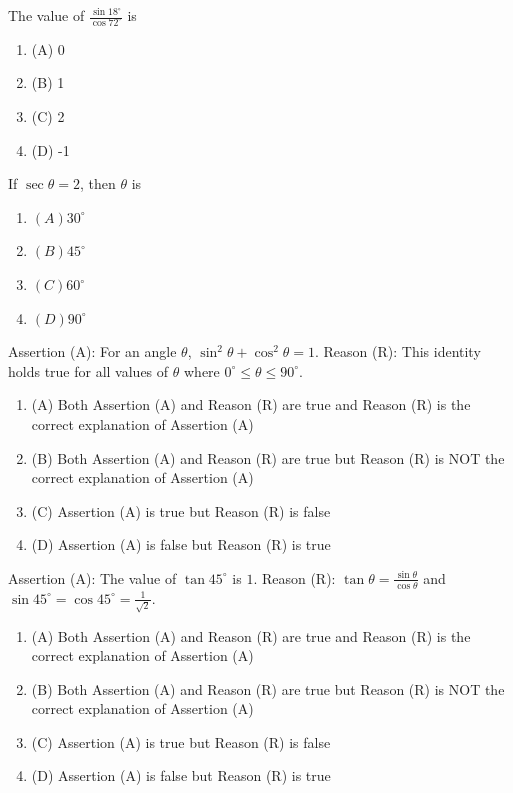\documentclass[12pt,a4paper]{exam}
\begin{document}
\begin{questions}
\question[1] The value of $\frac{\sin 18^\circ}{\cos 72^\circ}$ is
\begin{enumerate}[label=(\Alph*)]
  \item (A) 0
  \item (B) 1
  \item (C) 2
  \item (D) -1
\end{enumerate}
\vspace{0.15cm}

\question[1] If $\sec \theta = 2$, then $\theta$ is
\begin{enumerate}[label=(\Alph*)]
  \item $(A) 30^\circ$
  \item $(B) 45^\circ$
  \item $(C) 60^\circ$
  \item $(D) 90^\circ$
\end{enumerate}
\vspace{0.15cm}

\question[1] Assertion (A): For an angle $\theta$, $\sin^2 \theta + \cos^2 \theta = 1$. Reason (R): This identity holds true for all values of $\theta$ where $0^\circ \le \theta \le 90^\circ$.
\begin{enumerate}[label=(\Alph*)]
  \item (A) Both Assertion (A) and Reason (R) are true and Reason (R) is the correct explanation of Assertion (A)
  \item (B) Both Assertion (A) and Reason (R) are true but Reason (R) is NOT the correct explanation of Assertion (A)
  \item (C) Assertion (A) is true but Reason (R) is false
  \item (D) Assertion (A) is false but Reason (R) is true
\end{enumerate}
\vspace{0.15cm}

\question[1] Assertion (A): The value of $\tan 45^\circ$ is $1$. Reason (R): $\tan \theta = \frac{\sin \theta}{\cos \theta}$ and $\sin 45^\circ = \cos 45^\circ = \frac{1}{\sqrt{2}}$.
\begin{enumerate}[label=(\Alph*)]
  \item (A) Both Assertion (A) and Reason (R) are true and Reason (R) is the correct explanation of Assertion (A)
  \item (B) Both Assertion (A) and Reason (R) are true but Reason (R) is NOT the correct explanation of Assertion (A)
  \item (C) Assertion (A) is true but Reason (R) is false
  \item (D) Assertion (A) is false but Reason (R) is true
\end{enumerate}
\vspace{0.15cm}


\end{questions}
\end{document}
